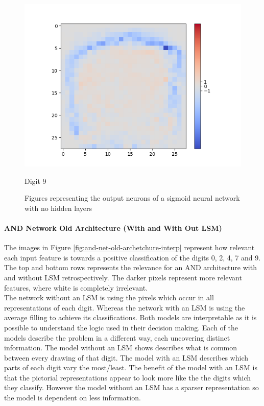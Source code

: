 \begin{figure}[H]
\begin{minipage}[b]{0.19\textwidth}
		\includegraphics[width=\textwidth]{Sigmoid(NO-Hidden)/Layer0-Neuron-9.png}
		\caption{Digit 9}
	\end{minipage}
	\hfill
	\caption{Figures representing the output neurons of a sigmoid neural network with no hidden layers}
\end{figure}


\paragraph{AND Network Old Architecture (With and With Out LSM)}
The images in Figure \ref{fig:and-net-old-archetchure-interp} represent how relevant each input feature is towards a positive classification of the digits 0, 2, 4, 7 and 9. The top and bottom rows represents the relevance for an AND architecture with and without LSM retrospectively. The darker pixels represent more relevant features, where white is completely irrelevant.\\

The network without an LSM is using the pixels which occur in all representations of each digit. Whereas the network with an LSM is using the average filling to achieve its classifications. Both models are interpretable as it is possible to understand the logic used in their decision making. Each of the models describe the problem in a different way, each uncovering distinct information. The model without an LSM shows describes what is common between every drawing of that digit. The model with an LSM describes which parts of each digit vary the most/least. The benefit of the model with an LSM is that the pictorial representations appear to look more like the the digits which they classify. However the model without an LSM has a sparser representation so the model is dependent on less information.

